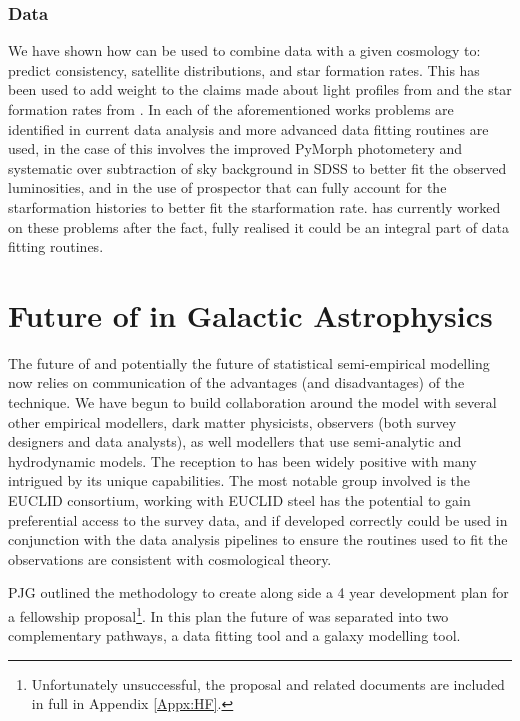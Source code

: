 \subsubsection{Data}

We have shown how \steel can be used to combine data with a given cosmology to: predict consistency, satellite distributions, and star formation rates. This has been used to add weight to the claims made about light profiles from \citet{Bernardi2017ComparingLight} and the star formation rates from \citet{Leja2019AnSurvey}. In each of the aforementioned works problems are identified in current data analysis and more advanced data fitting routines are used, in the case of \citet{Bernardi2017ComparingLight} this involves the improved PyMorph photometery and systematic over subtraction of sky background in SDSS to better fit the observed luminosities, and in \citet{Leja2019AnSurvey} the use of prospector that can fully account for the starformation histories to better fit the starformation rate. \steel has currently worked on these problems after the fact, fully realised it could be an integral part of data fitting routines.

\section{Future of \steel in Galactic Astrophysics}
\label{sec:Future}

The future of \steel and potentially the future of statistical semi-empirical modelling now relies on communication of the advantages (and disadvantages) of the technique. We have begun to build collaboration around the model with several other empirical modellers, dark matter physicists, observers (both survey designers and data analysts), as well modellers that use semi-analytic and hydrodynamic models. The reception to \steel has been widely positive with many intrigued by its unique capabilities. The most notable group involved is the EUCLID consortium, working with EUCLID steel has the potential to gain preferential access to the survey data, and if developed correctly could be used in conjunction with the data analysis pipelines to ensure the routines used to fit the observations are consistent with cosmological theory.

PJG outlined the methodology to create \steel along side a 4 year development plan for a fellowship proposal\footnote{Unfortunately unsuccessful, the proposal and related documents are included in full in Appendix \ref{Appx:HF}.}. In this plan the future of \steel was separated into two complementary pathways, a data fitting tool and a galaxy modelling tool. 

